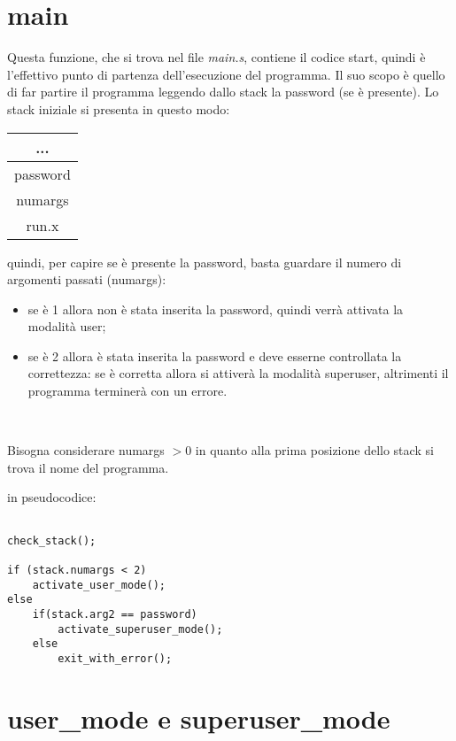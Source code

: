\documentclass[a4paper,titlepage]{book}
\begin{document}
\section{main}

Questa funzione, che si trova nel file \textit{main.s}, contiene il codice start, quindi è l'effettivo punto di partenza dell'esecuzione del programma. Il suo scopo è quello di far partire il programma leggendo dallo stack la password (se è presente). Lo stack iniziale si presenta in questo modo:

\begin{center}
\begin{tabular}{|c|}
\hline
...		\\ \hline
password	\\ \hline
numargs		\\ \hline
run.x		\\ \hline


\end{tabular}
\end{center}

quindi, per capire se è presente la password, basta guardare il numero di argomenti passati (numargs):

\begin{itemize}
\item se è 1 allora non è stata inserita la password, quindi verrà attivata la modalità user;
\item se è 2 allora è stata inserita la password e deve esserne controllata la correttezza: se è corretta allora si attiverà la modalità superuser, altrimenti il programma terminerà con un errore.
\end{itemize}

~

Bisogna considerare numargs $> 0$ in quanto alla prima posizione dello stack si trova il nome del programma.

\newpage
in pseudocodice:

\begin{lstlisting}

check_stack();

if (stack.numargs < 2)
	activate_user_mode();
else	
	if(stack.arg2 == password)
		activate_superuser_mode();
	else
		exit_with_error(); 

\end{lstlisting}

\section{user\_mode e superuser\_mode}
\end{document}
